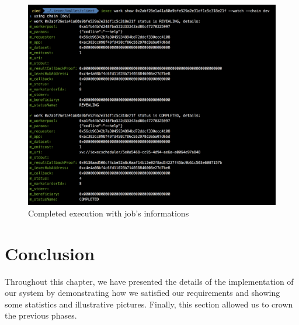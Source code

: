     \begin{figure}[!h]\centering
        \includegraphics[width=\columnwidth]{6-Implementation/figs/illustration-9.png}
        \caption{Completed execution with job's informations}
    \end{figure}

    \clearpage

\section{Conclusion}
    Throughout this chapter, we have presented the details of the implementation of our system by demonstrating
    how we satisfied our requirements and showing some statistics and illustrative pictures.
    Finally, this section allowed us to crown the previous phases.